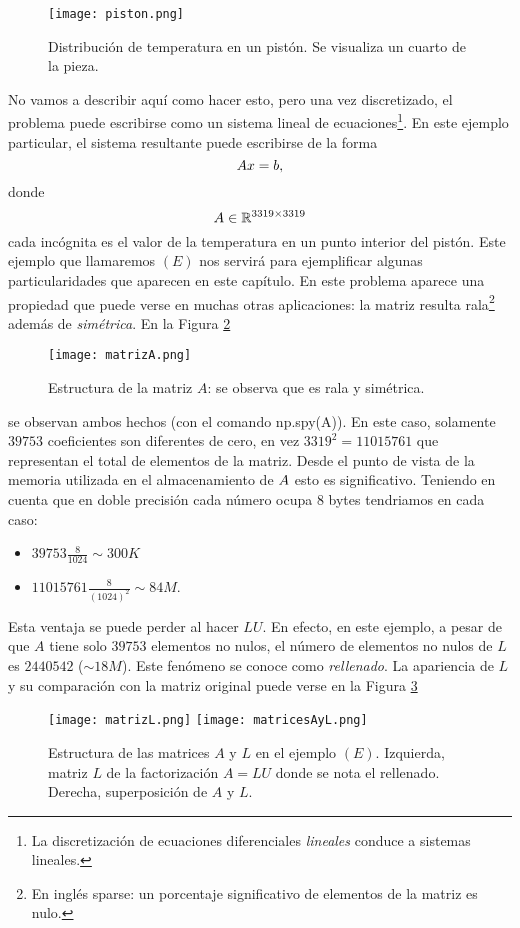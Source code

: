\begin{figure}[h]
\centering\texttt{[image: piston.png]}
\label{fig:disc_piston}
\caption{Distribución de temperatura en un pistón. Se visualiza un cuarto de la pieza.}
\end{figure}
No vamos a describir aquí como hacer esto, pero una vez discretizado, el problema puede escribirse como un sistema lineal de ecuaciones\footnote{La discretización de ecuaciones diferenciales \emph{lineales} conduce a sistemas lineales.}. En este ejemplo particular, el sistema resultante  puede escribirse de la forma
 $$
 \Ab\xb=\bb,
 $$
 donde
 $$\Ab\in \R^{3319\times 3319}$$
cada incógnita es el valor de la temperatura en un punto interior del pistón. Este ejemplo que llamaremos $(E)$ nos servirá para ejemplificar algunas particularidades que aparecen en este capítulo. En este problema aparece una propiedad que puede verse en muchas otras aplicaciones: la matriz resulta rala\footnote{ En inglés sparse: un porcentaje significativo de elementos de la matriz es nulo.} además de \emph{simétrica}. En la Figura \ref{fig:matrizA}
\begin{figure}[h]
\label{fig:matrizA}
\centering\texttt{[image: matrizA.png]}
\caption{Estructura de la matriz $A$: se observa que es rala y simétrica.}
\end{figure}
se observan ambos hechos (con el comando np.spy(A)). En este caso, solamente $39753$ coeficientes son diferentes de cero, en vez $3319^2=11015761$ que representan el total de elementos de la matriz. Desde  el punto de vista de la memoria utilizada en el almacenamiento de $\Ab$ esto es significativo. Teniendo en cuenta que en doble precisión cada número ocupa 8 bytes tendriamos en cada caso:
\begin{itemize}
 \item $39753\frac{8}{1024}\sim 300K$
 \item $11015761 \frac{8}{(1024)^2}\sim 84M$.
\end{itemize}
Esta ventaja se puede perder al hacer $LU$.
En efecto, en este ejemplo, a pesar de que $A$ tiene solo $39753$ elementos no nulos, el número de elementos no nulos de $L$ es $2440542$ ($\sim 18M$). Este fenómeno se conoce como \emph{rellenado}. La apariencia de $L$ y su comparación con la matriz original puede verse en la Figura \ref{fig:LyA}

\begin{figure}[h]
\centering\texttt{[image: matrizL.png]}
\centering\texttt{[image: matricesAyL.png]}
\label{fig:LyA}
\caption{Estructura de las matrices $A$ y $L$ en el ejemplo $(E)$. Izquierda, matriz $L$ de la factorización $A=LU$ donde se nota el rellenado. Derecha, superposición de $A$ y $L$.}
\end{figure}


